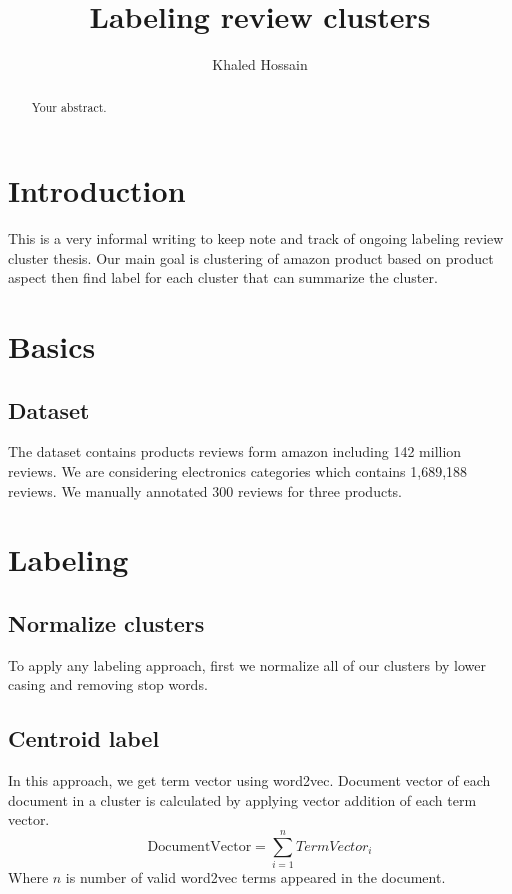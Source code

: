 \documentclass[a4paper]{article}
\title{Labeling review clusters}
\author{Khaled Hossain}
\begin{document}
\maketitle

\begin{abstract}
Your abstract.
\end{abstract}

\section{Introduction}

This is a very informal writing to keep note and track of ongoing labeling review cluster thesis. Our main goal is clustering of amazon product based on product aspect then find label for each cluster that can summarize the cluster.

\section{Basics}

\subsection{Dataset}

The dataset contains products reviews form amazon including 142 million reviews. We are considering electronics categories which contains 1,689,188 reviews. We manually annotated 300 reviews for three products.

\section{Labeling}

\subsection{Normalize clusters}

To apply any labeling approach, first we normalize all of our clusters by lower casing and removing stop words.

\subsection{Centroid label}

In this approach, we get term vector using word2vec. Document vector of each document in a cluster is calculated by applying vector addition of each term vector.
$$\text{DocumentVector} = \sum_{i=1}^{n} TermVector_i$$
Where $n$ is number of valid word2vec terms appeared in the document.
\end{document}
